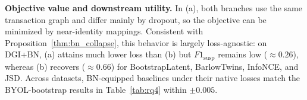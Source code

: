 \documentclass[sigconf,natbib=true,anonymous=true]{acmart}
\theoremstyle{definition}
\begin{document}
\textbf{Objective value and downstream utility.} In (a), both branches use the same transaction graph and differ mainly by dropout, so the objective can be minimized by near-identity mappings. Consistent with Proposition~\ref{thm:bn_collapse}, this behavior is largely loss-agnostic: on DGI+BN, (a) attains much lower loss than (b) but $F1_{\text{susp}}$ remains low ($\approx 0.26$), whereas (b) recovers ($\approx 0.66$) for BootstrapLatent, BarlowTwins, InfoNCE, and JSD. Across datasets, BN-equipped baselines under their native losses match the BYOL-bootstrap results in Table~\ref{tab:rq4} within $\pm 0.005$.

\begin{table}[h]
\centering
\caption{Full label-efficiency results: $F1_{\text{susp}}$ at $\{1\%,5\%,10\%\}$ labels on three AML datasets (4-seed mean$\pm$std). Bold and underline denote best and second-best values.}


\end{table}
\end{document}
